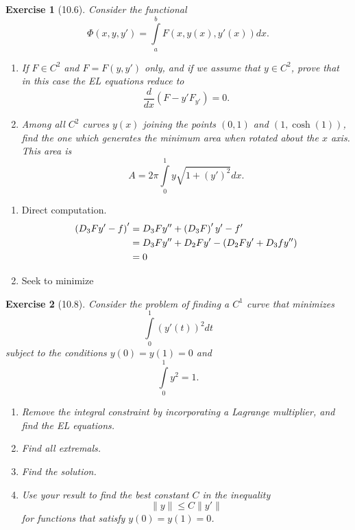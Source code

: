 \documentclass[letterpaper,twoside,11pt]{article}
\theoremstyle{mystyle}
\newtheorem*{exercise}{Exercise}
\newcommand{\cbk}{\color{black}}
\newcommand{\cblu}{\color{blue}}
\begin{document}
\begin{exercise}[10.6]
  Consider the functional 
  \[\Phi(x, y, y') = \int\limits_a^b F(x, y(x), y'(x))dx.\]
  \begin{enumerate}
    \item If $F \in C^2$ and $F = F(y, y')$ only, and if we assume that $y \in C^2$, prove that in this case the EL equations reduce to 
    \[\frac{d}{dx}\left( F - y'F_{y'} \right) = 0.\]
    \item Among all $C^2$ curves $y(x)$ joining the points $(0,1)$ and $(1, \cosh(1))$, find the one which generates the minimum area when rotated about the $x$ axis. This area is 
    \[A = 2\pi \int\limits_0^1 y \sqrt{1 + (y')^2} dx.\]
  \end{enumerate}
\end{exercise}

\cblu 

\begin{enumerate}
  \item Direct computation. 
  \begin{align*}
      \left( {{D_3}Fy' - f} \right)' &= {D_3}Fy'' + \left( {{D_3}F} \right)'y' - f' \hfill \\
       &= {D_3}Fy'' + {D_2}Fy' - \left( {{D_2}Fy' + {D_3}fy''} \right) \hfill \\
       &= 0 
  \end{align*}
  \item Seek to minimize 
\end{enumerate}

\cbk 



\begin{exercise}[10.8]
  Consider the problem of finding a $C^1$ curve that minimizes 
  \[\int\limits_0^1 (y'(t))^2 dt\]
  subject to the conditions $y(0) = y(1) = 0$ and 
  \[\int\limits_0^1 y^2 = 1.\]
  \begin{enumerate}
    \item Remove the integral constraint by incorporating a Lagrange multiplier, and find the EL equations. 
    \item Find all extremals. 
    \item Find the solution. 
    \item Use your result to find the best constant $C$ in the inequality 
    \[\|y\|\leq C \|y'\|\]
    for functions that satisfy $y(0) = y(1) = 0$. 
  \end{enumerate}
\end{exercise}
\end{document}
